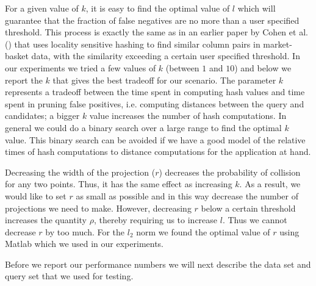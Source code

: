 \documentclass[12pt]{article}
\begin{document}
For a given value of $k$, it is easy to find the optimal value of $l$
which will guarantee that the fraction of false negatives are no more than
a user specified threshold. This process is exactly the same as in an
earlier paper by Cohen et al. (\cite{eight}) that uses locality sensitive
hashing to find similar column pairs in market-basket data, with the
similarity exceeding a certain user specified threshold. In our
experiments we tried a few values of $k$ (between $1$ and $10$) and below
we report the $k$ that gives the best tradeoff for our scenario. The
parameter $k$ represents a tradeoff between the time spent in computing
hash values and time spent in pruning false positives, i.e. computing
distances between the query and candidates; a bigger $k$ value 
increases the number of hash computations. In general we could do a binary
search over a large range to find the optimal $k$ value. This binary
search can be avoided if we have a good model of the relative times of
hash computations to distance computations for the application at hand.

Decreasing the width of the projection ($r$) decreases the probability
of collision for any two points. Thus, it has the same effect as
increasing $k$. As a result, we would like to set $r$ as small as
possible and in this way decrease the number of projections we need to
make.  However, decreasing $r$ below a certain threshold increases the
quantity $\rho$, thereby requiring us to increase $l$. Thus we cannot
decrease $r$ by too much. For the $l_2$ norm we found the optimal value
of $r$ using Matlab which we used in our experiments.

Before
we report our performance numbers we will next describe the data
set and query set that we used for testing.
\end{document}
